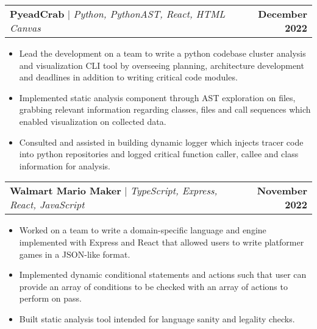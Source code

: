 \documentclass[letterpaper,11pt]{article}
\makeatletter
\newcommand{\resumeItem}[1]{
  \item\small{
    {#1 \vspace{-3pt}}
  }
}
\newcommand{\resumeProjectHeading}[2]{
    \item
    \begin{tabular*}{0.97\textwidth}{l@{\extracolsep{\fill}}r}
      \small#1 & #2 \\
    \end{tabular*}\vspace{-5pt}
}
\newcommand{\resumeItemListStart}{\begin{itemize}}
\newcommand{\resumeItemListEnd}{\end{itemize}\vspace{-6pt}}
\makeatother
\begin{document}
          \resumeProjectHeading
          {\textbf{PyeadCrab} $|$ \emph{Python, PythonAST, React, HTML Canvas}}{\textbf{December 2022}}
          \resumeItemListStart
            \resumeItem{Lead the development on a team to write a python codebase cluster analysis and visualization CLI tool by overseeing planning, architecture development and deadlines in addition to writing critical code modules.}
            \resumeItem{Implemented static analysis component through AST exploration on files, grabbing relevant information regarding classes, files and call sequences which enabled visualization on collected data.}
            \resumeItem{Consulted and assisted in building dynamic logger which injects tracer code into python repositories and logged critical function caller, callee and class information for analysis.}
          \resumeItemListEnd

                    \resumeProjectHeading
          {\textbf{Walmart Mario Maker} $|$ \emph{TypeScript, Express, React, JavaScript}}{\textbf{November 2022}}
          \resumeItemListStart
            \resumeItem{Worked on a team to write a domain-specific language and engine implemented with Express and React that allowed users to write platformer games in a JSON-like format.}
            \resumeItem{Implemented dynamic conditional statements and actions such that user can provide an array of conditions to be checked with an array of actions to perform on pass.}
            \resumeItem{Built static analysis tool intended for language sanity and legality checks.}
          \resumeItemListEnd

          
\end{document}
